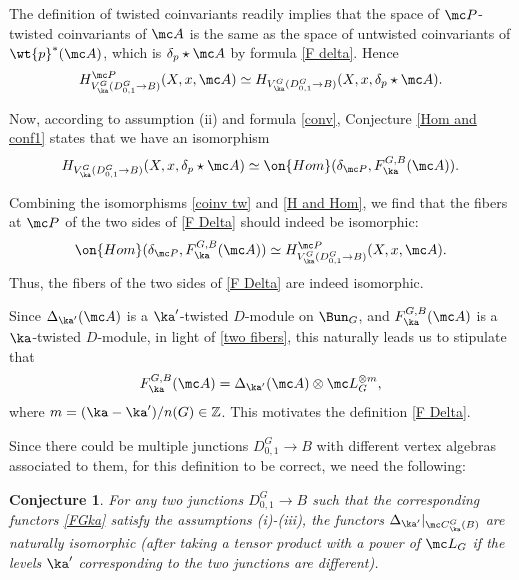 \documentclass[11pt,reqno]{amsart}
\theoremstyle{plain}
\newtheorem{conj}[theorem]{Conjecture}
\numberwithin{equation}{section}
\newcommand{\Z}{\mathbb{Z}}
\theoremstyle{definition}
\begin{document}
The definition of twisted coinvariants readily implies that the space
of ${\mc P}$-twisted coinvariants of ${\mc A}$ is the same as the
space of untwisted coinvariants of $\wt{p}^*({\mc A})$, which is
$\delta_p \star {\mc A}$ by formula \eqref{F delta}. Hence
\begin{equation}    \label{coinv tw}
H_{V^G_\ka(D^G_{0,1}\to B)}^{\mc P}(X,x,{\mc
  A}) \simeq H_{V^G_\ka(D^G_{0,1}\to B)}(X,x,\delta_p \star {\mc
  A}).
\end{equation}

Now, according to assumption (ii) and formula \eqref{conv}, Conjecture
\ref{Hom and conf1} states that we have an isomorphism
\begin{equation}    \label{H and Hom}
H_{V^G_\ka(D^G_{0,1}\to
    B)}(X,x,\delta_p \star {\mc A}) \simeq \on{Hom}(\delta_{\mc
    P},F^{G,B}_\ka({\mc A})).
\end{equation}

Combining the isomorphisms \eqref{coinv tw} and \eqref{H and Hom}, we
find that the fibers at ${\mc P}$ of the two sides of \eqref{F
  Delta} should indeed be isomorphic:
\begin{equation}    \label{two fibers}
\on{Hom}(\delta_{\mc P},F^{G,B}_\ka({\mc A})) \simeq 
H_{V^G_\ka(D^G_{0,1}\to B)}^{\mc P}(X,x,{\mc A}).
\end{equation}
Thus, the fibers of the two sides of \eqref{F Delta} are indeed
isomorphic.

Since $\Delta_{\ka'}({\mc A})$ is a $\ka'$-twisted $D$-module on
$\Bun_G$, and $F^{G,B}_\ka({\mc A})$ is a $\ka$-twisted $D$-module,
in light of \eqref{two fibers}, this naturally leads us to stipulate
that
$$
F^{G,B}_\ka({\mc A}) = \Delta_{\ka'}({\mc A}) \otimes {\mc
  L}_G^{\otimes m},
$$
where $m=(\ka-\ka')/n(G) \in \Z$. This motivates the definition
\eqref{F Delta}.

Since there could be multiple junctions $D^G_{0,1} \to B$ with
different vertex algebras associated to them, for this definition to
be correct, we need the following:

\begin{conj}    \label{meta1}
For any two junctions $D^G_{0,1} \to B$ such that the corresponding
functors \eqref{FGka} satisfy the assumptions (i)-(iii), the
functors $\Delta_{\ka'}|_{{\mc C}^G_\ka(B)}$ are naturally isomorphic
(after taking a tensor product with a power of ${\mc L}_G$ if
the levels $\ka'$ corresponding to the two junctions are different).
\end{conj}
\end{document}
